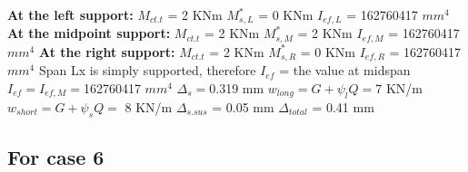 \documentclass{article}%
\begin{document}
%
\newline%
\newline%
%
\textbf{At the left support:}%
\newline%
\newline%
%
$M_{ct.t}$ = 2 KNm%
\newline%
%
$M_{s,L}^{*}$ = 0 KNm%
\newline%
%
$I_{ef,L}$ = 162760417 $mm^{4}$%
\newline%
\newline%
%
\textbf{At the midpoint support:}%
\newline%
\newline%
%
$M_{ct.t}$ = 2 KNm%
\newline%
%
$M_{s,M}^{*}$ = 2 KNm%
\newline%
%
$I_{ef,M}$ = 162760417 $mm^{4}$%
\newline%
\newline%
%
\textbf{At the right support:}%
\newline%
\newline%
%
$M_{ct.t}$ = 2 KNm%
\newline%
%
$M_{s,R}^{*}$ = 0 KNm%
\newline%
%
$I_{ef,R}$ = 162760417 $mm^{4}$%
\newline%
\newline%
%
Span Lx is simply supported, therefore $I_{ef}$ = the value at midspan%
\newline%
\newline%
%
$I_{ef} = I_{ef,M} = $162760417 $ mm^{4}$%
\newline%
\newline%
%
$\Delta_{s} =$0.319 mm%
\newline%
\newline%
%
$w_{long} = G + \psi_{l}Q = $7 KN/m%
\newline%
%
$w_{short} = G + \psi_{s}Q = $ 8 KN/m%
\newline%
\newline%
%
$\Delta_{s.sus}$ = 0.05 mm%
\newline%
\newline%
%
$\Delta_{total}$ = 0.41 mm%
\subsection*{For case 6}%
\label{subsec:Forcase6}%
\end{document}
